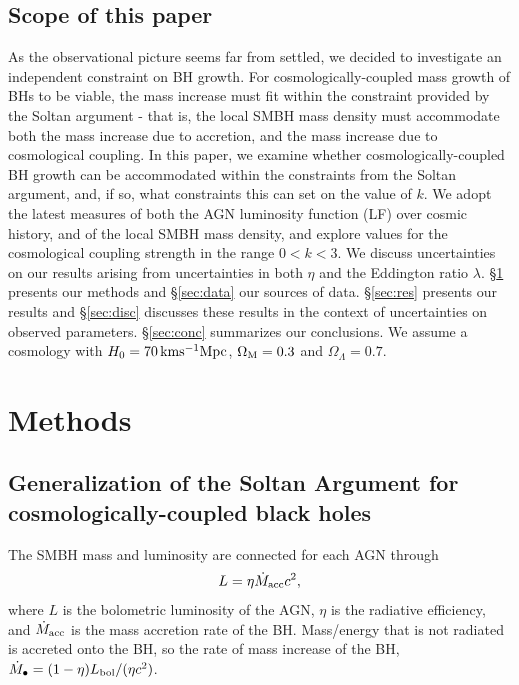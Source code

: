 \documentclass[twocolumn]{aastex631}
\begin{document}
\subsection{Scope of this paper}

As the observational picture seems far from settled, we decided to investigate an independent constraint on BH growth. For cosmologically-coupled mass growth of BHs to be viable, the mass increase must fit within the constraint provided by the Soltan argument - that is, the local SMBH mass density must accommodate both the mass increase due to accretion, and the mass increase due to cosmological coupling.  In this paper, we examine whether cosmologically-coupled BH growth can be accommodated within the constraints from the Soltan argument, and, if so, what constraints this can set on the value of $k$. We adopt the latest measures of both the AGN luminosity function (LF) over cosmic history, and of the local SMBH mass density, and explore values for the cosmological coupling strength in the range $0<k<3$. We discuss uncertainties on our results arising from uncertainties in both $\eta$ and the Eddington ratio $\lambda$. \S\ref{sec:meth} presents our methods and \S\ref{sec:data} our sources of data. \S\ref{sec:res} presents our results and  \S\ref{sec:disc}  discusses these results in the context of uncertainties on observed parameters. \S\ref{sec:conc} summarizes our conclusions. We assume a cosmology with $H_0=70\, {\rm kms^{-1}Mpc}$, $\Omega_{\rm M}=0.3$ and $\Omega_{\Lambda}=0.7$.


\section{Methods}\label{sec:meth}

\subsection{Generalization of the Soltan Argument for cosmologically-coupled black holes}\label{sec:genSoltan}

The SMBH mass and luminosity are connected for each AGN through 
\begin{equation}
L = \eta \dot{M}_{\rm acc} c^2,
\end{equation}
where $L$ is the bolometric luminosity of the AGN, $\eta$ is the radiative efficiency, and $\dot{M}_{\rm acc}$ is the mass accretion rate of the BH. Mass/energy that is not radiated is accreted onto the BH, so the rate of mass increase of the BH, $\dot{M}_{\bullet}=(1-\eta) L_{\rm{bol}}/(\eta c^2)$.
\end{document}
